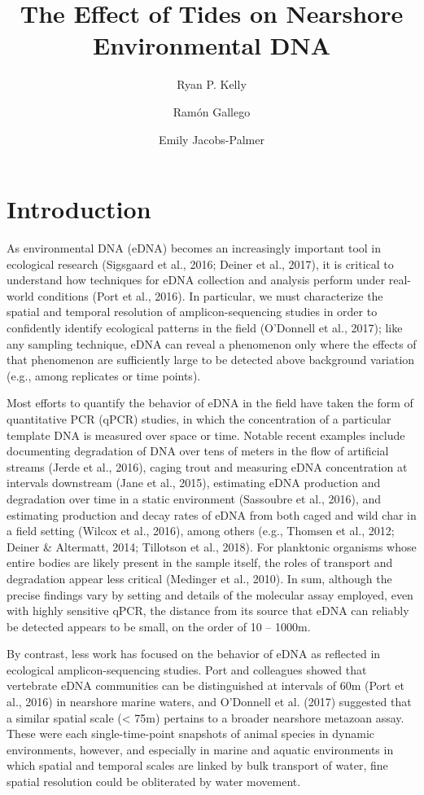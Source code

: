 \documentclass[fleqn,10pt,lineno]{wlpeerj} %
\title{The Effect of Tides on Nearshore Environmental DNA}
\author{Ryan P. Kelly}
\author{Ram\'{o}n Gallego}
\author{Emily Jacobs-Palmer}
\affil{University of Washington, School of Marine and Environmental Affairs, Seattle, Washington USA}
\begin{document}
\flushbottom
\maketitle
\thispagestyle{empty}

\section{Introduction}\label{introduction}

As environmental DNA (eDNA) becomes an increasingly important tool in
ecological research (Sigsgaard et al., 2016; Deiner et al., 2017), it is
critical to understand how techniques for eDNA collection and analysis
perform under real-world conditions (Port et al., 2016). In particular,
we must characterize the spatial and temporal resolution of
amplicon-sequencing studies in order to confidently identify ecological
patterns in the field (O'Donnell et al., 2017); like any sampling
technique, eDNA can reveal a phenomenon only where the effects of that
phenomenon are sufficiently large to be detected above background
variation (e.g., among replicates or time points).

Most efforts to quantify the behavior of eDNA in the field have taken
the form of quantitative PCR (qPCR) studies, in which the concentration
of a particular template DNA is measured over space or time. Notable
recent examples include documenting degradation of DNA over tens of
meters in the flow of artificial streams (Jerde et al., 2016), caging
trout and measuring eDNA concentration at intervals downstream (Jane et
al., 2015), estimating eDNA production and degradation over time in a
static environment (Sassoubre et al., 2016), and estimating production
and decay rates of eDNA from both caged and wild char in a field setting
(Wilcox et al., 2016), among others (e.g., Thomsen et al., 2012; Deiner
\& Altermatt, 2014; Tillotson et al., 2018). For planktonic organisms whose entire bodies are likely present in the sample itself, the roles of transport and degradation appear less critical (Medinger et al., 2010).  
In sum, although the precise findings vary by setting and
details of the molecular assay employed, even with highly sensitive
qPCR, the distance from its source that eDNA can reliably be detected
appears to be small, on the order of 10 -- 1000m.

By contrast, less work has focused on the behavior of eDNA as reflected
in ecological amplicon-sequencing studies. Port and colleagues showed
that vertebrate eDNA communities can be distinguished at intervals of
60m (Port et al., 2016) in nearshore marine waters, and O'Donnell et al.
(2017) suggested that a similar spatial scale (\textless{} 75m) pertains
to a broader nearshore metazoan assay. These were each
single-time-point snapshots of animal species in dynamic environments,
however, and especially in marine and aquatic environments in which
spatial and temporal scales are linked by bulk transport of water, fine
spatial resolution could be obliterated by water movement.
\end{document}
